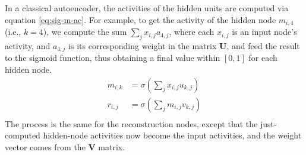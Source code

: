 In a classical autoencoder, the activities of the hidden units are computed via equation \ref{eq:sig-m-ac}. For example, to get the activity of the hidden node $m_{i,4}$ (i.e., $k = 4$), 
we compute the sum $\sum_{j} x_{i,j} a_{4,j}$, where each $x_{i,j}$ is an input node's activity, and $a_{4,j}$ is its corresponding weight in the matrix $\textbf{U}$,
and feed the result to the sigmoid function, thus obtaining a final value within $[0,1]$ for each hidden node.
	\begin{align} %
	\label{eq:sig-m-ac}
	m_{i,k} &=\sigma(\sum_{j} x_{i,j} u_{k,j}) \\
	\label{eq:sig-r-ac}
  	r_{i,j} &= \sigma(\sum_{j} m_{i,j} v_{k,j}) \\ 
	\end{align}
%	
The process is the same for the reconstruction nodes, except that the just-computed hidden-node activities now become the input activities, and the weight vector comes from the $\textbf{V}$ matrix.
